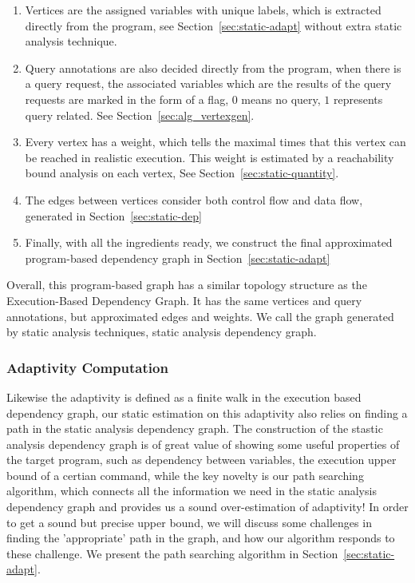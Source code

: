 \begin{enumerate}
\item  Vertices are the assigned variables with unique labels, which is extracted directly from the program, see Section~\ref{sec:static-adapt}
without extra static analysis technique.
\item Query annotations are also decided directly from the program, when there is a query request, the associated variables which are the results of the query requests are marked in the form of a flag, $0$ means no query, $1$ represents query related. See Section~\ref{sec:alg_vertexgen}.
\item Every 
vertex has a weight, which tells the maximal times that this vertex can be reached in realistic execution.
This weight is estimated by a reachability bound analysis on each vertex, See Section~\ref{sec:static-quantity}.
\item The edges between vertices consider both control flow and data flow, generated in
Section~\ref{sec:static-dep}
\item  Finally, with all the ingredients ready, we construct the final approximated program-based dependency graph in Section~\ref{sec:static-adapt}
\end{enumerate}

Overall, this program-based graph has a similar topology structure as 
the Execution-Based Dependency Graph. It has the same
vertices and query annotations, but approximated edges and weights. We call the graph generated by static analysis techniques, static analysis dependency graph. 

\subsubsection{Adaptivity Computation}

Likewise the adaptivity is defined as a finite walk in the execution based dependency graph, 
our static estimation on this adaptivity also relies on finding a path in the static analysis dependency graph.
The construction of the stastic analysis dependency graph is of great value of showing some useful properties of the target program, such as dependency between variables, 
the execution upper bound of a certian command, while the key novelty is our path searching algorithm, which connects all the information we need in the static analysis dependency graph and provides us a sound over-estimation of adaptivity! 
In order to get a sound but precise upper bound, 
we will discuss some challenges in finding the 'appropriate' path in the graph, and how our algorithm responds to these challenge. We present the path searching algorithm in Section~\ref{sec:static-adapt}.